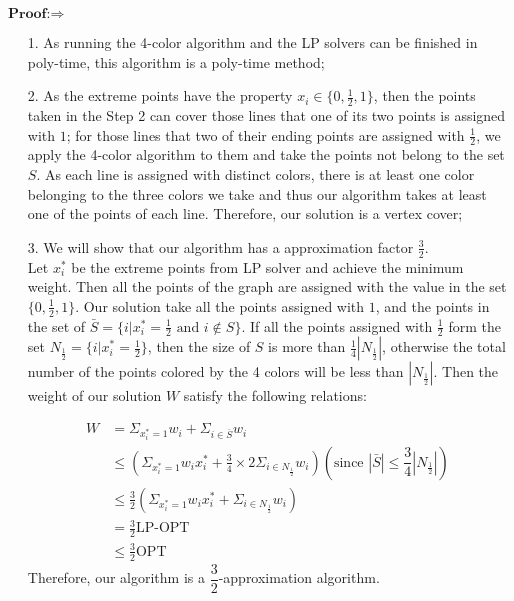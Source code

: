 \documentclass[a4paper,12pt]{article}
\begin{document}
$\textbf{Proof:} \Rightarrow $  
\begin{enumerate}
\item[1. ] As running the 4-color algorithm and the LP solvers  can be finished in  poly-time, this algorithm is a poly-time method; 
\item[2. ] As the extreme points have the property $x_i \in \{0,\frac{1}{2}, 1\}$, then the points taken in the Step 2 can cover those lines that one of its two points is assigned with $1$; for those lines that two of their ending points are assigned with $\frac{1}{2}$, we apply the 4-color algorithm to them and take the points not belong to the set $S$. As each line is assigned with distinct colors, there is at least one color belonging to the three colors we take and thus our algorithm takes at least one of the points of each line. Therefore, our solution is a vertex cover; 
\item[3. ] We will show that our algorithm has a approximation factor $\frac{3}{2}$.\\

Let $x_i^*$ be the extreme points from LP solver and achieve the minimum weight. Then all the points of the graph are assigned with the value in the set $\{0,\frac{1}{2}, 1\}$. Our solution take all the points assigned with $1$, and the points in the set of $\bar{S}=\{i| x_i^*=\frac{1}{2} \text{ and }i \notin S\}$. If all the points assigned with $\frac{1}{2}$ form the set $N_{\frac{1}{2}}=\{i| x_i^*=\frac{1}{2} \}$, then the size of $S$ is more than $\frac{1}{4} |N_{\frac{1}{2}}|$, otherwise the total number of the points colored by the 4 colors will be less than $|N_{\frac{1}{2}}|$.  Then the weight of our solution $W$ satisfy the following relations:

\begin{align}
W &=\Sigma_{x_i^*=1} w_i +\Sigma_{  i \in \bar{S}} w_i
\\&  \leq (\Sigma_{x_i^*=1} w_i x_i^* + \frac{3}{4} \times  2 \Sigma_{i \in N_{\frac{1}{2}}} w_i)  (\text{since $|\bar{S}| \leq \dfrac{3}{4}|N_{\frac{1}{2}}|$})
\\ & \leq \frac{3}{2} (\Sigma_{x_i^*=1} w_i x_i^* + \Sigma_{i \in N_{\frac{1}{2}}} w_i)
\\ &= \frac{3}{2} \text{LP-OPT}
\\ & \leq \frac{3}{2} \text{OPT}
\end{align} 
Therefore, our algorithm is a $\dfrac{3}{2}$-approximation algorithm.  
  
\end{enumerate}
\end{document}
